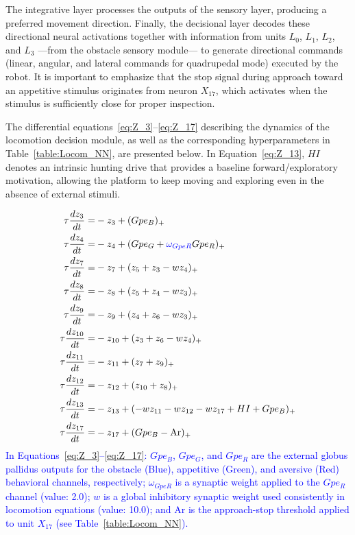 \documentclass[preprint,12pt]{elsarticle}
\newcommand{\revblue}[1]{\textcolor{blue}{#1}}
\begin{document}
The integrative layer processes the outputs of the sensory layer, producing a preferred movement direction. Finally, the decisional layer decodes these directional neural activations together with information from units $L_0$, $L_1$, $L_2$, and $L_3$ ---from the obstacle sensory module--- to generate directional commands (linear, angular, and lateral commands for quadrupedal mode) executed by the robot. It is important to emphasize that the stop signal during approach toward an appetitive stimulus originates from neuron $X_{17}$, which activates when the stimulus is sufficiently close for proper inspection. 

The differential equations~\eqref{eq:Z_3}–\eqref{eq:Z_17} describing the dynamics of the locomotion decision module, as well as the corresponding hyperparameters in Table~\ref{table:Locom_NN}, are presented below. In Equation~\eqref{eq:Z_13}, $HI$ denotes an intrinsic hunting drive that provides a baseline forward/exploratory motivation, allowing the platform to keep moving and exploring even in the absence of external stimuli.

\begin{align}
\tau \frac{dz_3}{dt} =& -z_3 + (Gpe_{B})_+
\label{eq:Z_3}
\\
\tau \frac{dz_4}{dt} =& -z_4 + (Gpe_{G} + \textcolor{blue}{\omega_{GpeR}}   Gpe_{R})_+
\\
\tau \frac{dz_7}{dt} =& -z_7 + (z_5 + z_3 - w   z_4)_+
\\
\tau \frac{dz_8}{dt} =& -z_8 + (z_5 + z_4 - w   z_3)_+
\\
\tau \frac{dz_9}{dt} =& -z_9 + (z_4 + z_6 - w   z_3)_+
\\
\tau \frac{dz_{10}}{dt} =& -z_{10} + (z_3 + z_6 - w   z_4)_+
\\
\tau \frac{dz_{11}}{dt} =& -z_{11} + (z_7 + z_9)_+
\\
\tau \frac{dz_{12}}{dt} =& -z_{12} + (z_{10} + z_8)_+
\\
\tau \frac{dz_{13}}{dt} =& -z_{13} + (-w z_{11} - w z_{12}
- w z_{17} + HI + Gpe_{B} )_+
\label{eq:Z_13}
\\
\tau \frac{dz_{17}}{dt} =& -z_{17} + (Gpe_{B} - \text{Ar})_+
\label{eq:Z_17}
\end{align}
\revblue{In Equations~\eqref{eq:Z_3}–\eqref{eq:Z_17}: $Gpe_B$, $Gpe_G$, and $Gpe_R$ are the external globus pallidus outputs for the obstacle (Blue), appetitive (Green), and aversive (Red) behavioral channels, respectively; $\omega_{GpeR}$ is a synaptic weight applied to the $Gpe_R$ channel (value: 2.0); $w$ is a global inhibitory synaptic weight used consistently in locomotion equations (value: 10.0); and $\text{Ar}$ is the approach-stop threshold applied to unit $X_{17}$ (see Table~\ref{table:Locom_NN}).}
\end{document}
